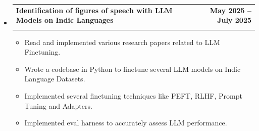 \documentclass[letterpaper,11pt]{article}
\makeatletter
\newcommand{\resumeItem}[1]{
  \item\small{
    {#1 \vspace{-2pt}}
  }
}
\newcommand{\resumeSubheading}[4]{
  \vspace{-2pt}\item
    \begin{tabular*}{1.0\textwidth}[t]{l@{\extracolsep{\fill}}r}
      \textbf{#1} & \textbf{\small #2} \\
      \textit{\small#3} & \textit{\small #4} \\
    \end{tabular*}\vspace{-7pt}
}
\newcommand{\resumeSubHeadingListStart}{\begin{itemize}[leftmargin=0.0in, label={}]}
\newcommand{\resumeSubHeadingListEnd}{\end{itemize}}
\newcommand{\resumeItemListStart}{\begin{itemize}}
\newcommand{\resumeItemListEnd}{\end{itemize}\vspace{-5pt}}
\makeatother
\begin{document}
\resumeSubHeadingListStart
\resumeSubheading{Identification of figures of speech with LLM Models on Indic Languages}{May 2025 -- July 2025}{}{}
\resumeItemListStart
\resumeItem{Read and implemented various research papers related to LLM Finetuning.}
\resumeItem{Wrote a codebase in Python to finetune several LLM models on Indic Language Datasets.}
\resumeItem{Implemented several finetuning techniques like PEFT, RLHF, Prompt Tuning and Adapters.}
\resumeItem{Implemented eval harness to accurately assess LLM performance.}
\resumeItemListEnd
\resumeSubHeadingListEnd
\end{document}
